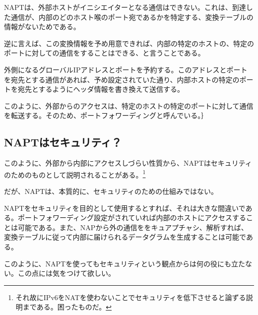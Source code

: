 NAPTは、外部ホストがイニシエイターとなる通信はできない。これは、到達した通信が、内部のどのホスト喉のポート宛であるかを特定する、変換テーブルの情報がないためである。

逆に言えば、この変換情報を予め用意できれば、内部の特定のホストの、特定のポートに対しての通信をすることはできる、と言うことである。

外側になるグローバルIPアドレスとポートを予約する。このアドレスとポートを宛先とする通信があれば、予め設定されていた通り、内部ホストの特定のポートを宛先とするようにヘッダ情報を書き換えて送信する。

このように、外部からのアクセスは、特定のホストの特定のポートに対して通信を転送する。そのため、ポートフォワーディングと呼んでいる。｝

\subsection{NAPTはセキュリティ？}
このように、外部から内部にアクセスしづらい性質から、NAPTはセキュリティのためのものとして説明されることがある。\footnote{それ故にIPv6をNATを使わないことでセキュリティを低下させると論ずる説明まである。困ったものだ。}

だが、NAPTは、本質的に、セキュリティのための仕組みではない。

NAPTをセキュリティを目的として使用するとすれば、それは大きな間違いである。ポートフォワーディング設定がされていれば内部のホストにアクセスすることは可能である。また、NAPから外の通信ををキュアプチャシ、解析すれば、変換テーブルに従って内部に届けられるデータグラムを生成することは可能である。

このように、NAPTを使ってもセキュリティという観点からは何の役にも立たない。この点には気をつけて欲しい。